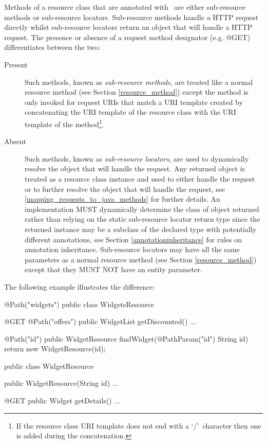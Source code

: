 Methods of a resource class that are annotated with \Path\ are either sub-resource methods or sub-resource locators. Sub-resource methods handle a HTTP request directly whilst sub-resource locators return an object that will handle a HTTP request. The presence or absence of a request method designator (e.g. @GET) differentiates between the two:

\begin{description}
\item[Present] Such methods, known as {\em sub-resource methods}, are treated like a normal resource method (see Section \ref{resource_method}) except the method is only invoked for request URIs that match a URI template created by concatenating the URI template of the resource class with the URI template of the method\footnote{If the resource class URI template does not end with a \lq/\rq\ character then one is added during the concatenation.}.
\item[Absent] Such methods, known as {\em sub-resource locators}, are used to dynamically resolve the object that will handle the request. Any returned object is treated as a resource class instance and used to either handle the request or to further resolve the object that will handle the request, see \ref{mapping_requests_to_java_methods} for further details. An implementation MUST dynamically determine the class of object returned rather than relying on the static sub-resource locator return type since the returned instance may be a subclass of the declared type with potentially different annotations, see Section \ref{annotationinheritance} for rules on annotation inheritance. Sub-resource locators may have all the same parameters as a normal resource method (see Section \ref{resource_method}) except that they MUST NOT have an entity parameter. 
\end{description}

The following example illustrates the difference:

\begin{listing}{1}
@Path("widgets")
public class WidgetsResource {
  @GET
  @Path("offers")
  public WidgetList getDiscounted() {...}
  
  @Path("{id}")
  public WidgetResource findWidget(@PathParam("id") String id) {
    return new WidgetResource(id);
  }
}

public class WidgetResource {
  public WidgetResource(String id) {...}

  @GET
  public Widget getDetails() {...}
}\end{listing}

